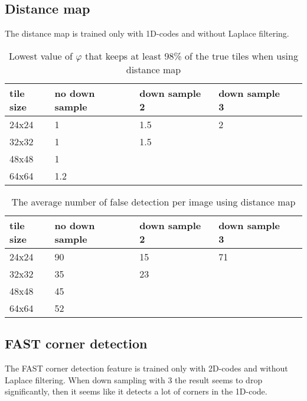 \subsection{Distance map}
The distance map is trained only with 1D-codes and without Laplace filtering.

\begin{table}[H]
\begin{center}
     \begin{tabular}{ | l | l | l | l | l |}
     \hline
     tile size & no down sample & down sample 2 & down sample 3 \\ \hline
   	 24x24 & 1 & 1.5 & 2 		\\ \hline
     32x32 & 1 & 1.5  & 		\\ \hline
     48x48 & 1 &     &  		\\ \hline
     64x64 & 1.2 &     &		\\ \hline
     \end{tabular}
\end{center}
\caption{Lowest value of $\varphi$ that keeps at least 98\% of the true tiles when using distance map}
\end{table}

\begin{table}[H]
\begin{center}
     \begin{tabular}{ | l | l | l | l | l |}
     \hline
     tile size & no down sample & down sample 2 & down sample 3 \\ \hline
   	 24x24 & 90 & 15 & 71 	    \\ \hline
     32x32 & 35 & 23 & 			\\ \hline
     48x48 & 45    &     &  	\\ \hline
     64x64 & 52     &     &		\\ \hline
     \end{tabular}
\end{center}
\caption{The average number of false detection per image using distance map}
\end{table}


\subsection{FAST corner detection}
The FAST corner detection feature is trained only with 2D-codes and without Laplace filtering. When down sampling with 3 the result seems to drop significantly, then it seems like it detects a lot of corners in the 1D-code.

